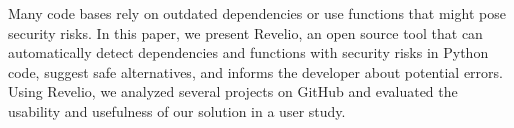 Many code bases rely on outdated dependencies or use functions that might pose security risks. In this paper, we present Revelio, an open source tool that can automatically detect dependencies and functions with security risks in Python code, suggest safe alternatives, and informs the developer about potential errors. Using Revelio, we analyzed several projects on GitHub and evaluated the usability and usefulness of our solution in a user study. 